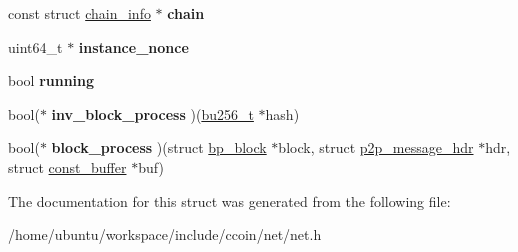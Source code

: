 \begin{DoxyCompactItemize}
\item 
\hypertarget{structnet__child__info_ab6ee72882f9813d4e3d31e98ed9ddaef}{const struct \hyperlink{structchain__info}{chain\-\_\-info} $\ast$ {\bfseries chain}}\label{structnet__child__info_ab6ee72882f9813d4e3d31e98ed9ddaef}

\item 
\hypertarget{structnet__child__info_adbc9e7ec9aaa38f698072618fa39b171}{uint64\-\_\-t $\ast$ {\bfseries instance\-\_\-nonce}}\label{structnet__child__info_adbc9e7ec9aaa38f698072618fa39b171}

\item 
\hypertarget{structnet__child__info_aaf37da9f4fb518f3953c4d7d547894a2}{bool {\bfseries running}}\label{structnet__child__info_aaf37da9f4fb518f3953c4d7d547894a2}

\item 
\hypertarget{structnet__child__info_a3794a222d2d15ef9e68f0ad666bd130d}{bool($\ast$ {\bfseries inv\-\_\-block\-\_\-process} )(\hyperlink{structbu256}{bu256\-\_\-t} $\ast$hash)}\label{structnet__child__info_a3794a222d2d15ef9e68f0ad666bd130d}

\item 
\hypertarget{structnet__child__info_a1d46160810f899b056265753e6c5db02}{bool($\ast$ {\bfseries block\-\_\-process} )(struct \hyperlink{structbp__block}{bp\-\_\-block} $\ast$block, struct \hyperlink{structp2p__message__hdr}{p2p\-\_\-message\-\_\-hdr} $\ast$hdr, struct \hyperlink{structconst__buffer}{const\-\_\-buffer} $\ast$buf)}\label{structnet__child__info_a1d46160810f899b056265753e6c5db02}

\end{DoxyCompactItemize}


The documentation for this struct was generated from the following file\-:\begin{DoxyCompactItemize}
\item 
/home/ubuntu/workspace/include/ccoin/net/net.\-h\end{DoxyCompactItemize}

